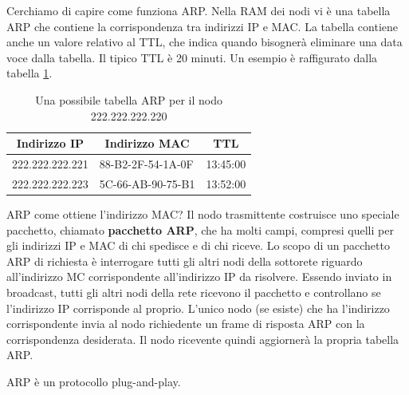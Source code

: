\documentclass[11pt,a4paper]{article}
\begin{document}
Cerchiamo di capire come funziona ARP. Nella RAM dei nodi vi è una tabella ARP che contiene la corrispondenza tra indirizzi IP e MAC. La tabella contiene anche un valore relativo al TTL, che indica quando bisognerà eliminare una data voce dalla tabella. Il tipico TTL è 20 minuti. Un esempio è raffigurato dalla tabella \ref{tab: 002}.
\begin{center}
	\begin{table}[]
		\begin{tabular}{|l|l|l|}
			\hline
			\multicolumn{1}{|c|}{\textbf{Indirizzo IP}} & \multicolumn{1}{c|}{\textbf{Indirizzo MAC}} & \multicolumn{1}{c|}{\textbf{TTL}} \\ \hline
			222.222.222.221                             & 88-B2-2F-54-1A-0F                           & 13:45:00                          \\ \hline
			222.222.222.223                             & 5C-66-AB-90-75-B1                           & 13:52:00                          \\ \hline
		\end{tabular}
		\caption{Una possibile tabella ARP per il nodo 222.222.222.220}
		\label{tab: 002}
	\end{table}
\end{center}


ARP come ottiene l'indirizzo MAC? Il nodo trasmittente costruisce uno speciale pacchetto, chiamato \textbf{pacchetto ARP}, che ha molti campi, compresi quelli per gli indirizzi IP e MAC di chi spedisce e di chi riceve. Lo scopo di un pacchetto ARP di richiesta è interrogare tutti gli altri nodi della sottorete riguardo all'indirizzo MC corrispondente all'indirizzo IP da risolvere. Essendo inviato in broadcast, tutti gli altri nodi della rete ricevono il pacchetto e controllano se l'indirizzo IP corrisponde al proprio. L'unico nodo (se esiste) che ha l'indirizzo corrispondente invia al nodo richiedente un frame di risposta ARP con la corrispondenza desiderata. Il nodo ricevente quindi aggiornerà la propria tabella ARP.

ARP è un protocollo plug-and-play.
\end{document}
